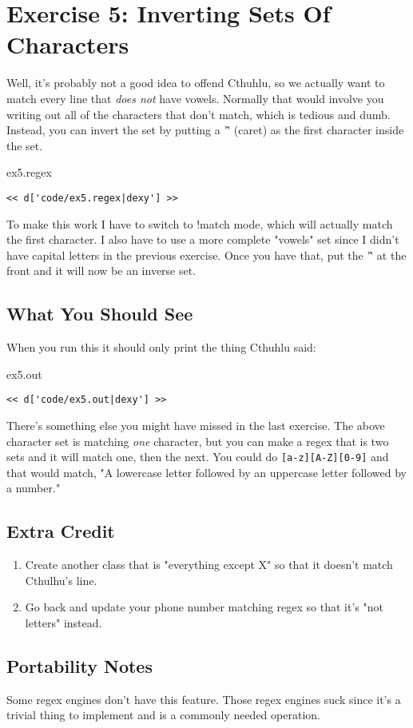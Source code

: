 \chapter{Exercise 5: Inverting Sets Of Characters}

Well, it's probably not a good idea to offend Cthuhlu, so we actually want
to match every line that \emph{does not} have vowels.  Normally that would
involve you writing out all of the characters that don't match, which is
tedious and dumb.  Instead, you can invert the set by putting a '\^' (caret)
as the first character inside the set.

\begin{code}{ex5.regex}
\begin{Verbatim}
<< d['code/ex5.regex|dexy'] >>
\end{Verbatim}
\end{code}

To make this work I have to switch to !match mode, which will actually
match the first character.  I also have to use a more complete "vowels"
set since I didn't have capital letters in the previous exercise.  Once
you have that, put the '\^' at the front and it will now be an inverse
set.

\section{What You Should See}

When you run this it should only print the thing Cthuhlu said:

\begin{code}{ex5.out}
\begin{Verbatim}
<< d['code/ex5.out|dexy'] >>
\end{Verbatim}
\end{code}

There's something else you might have missed in the last exercise.
The above character set is matching \emph{one} character, but you can
make a regex that is two sets and it will match one, then the next.
You could do \verb|[a-z][A-Z][0-9]| and that would match, "A lowercase
letter followed by an uppercase letter followed by a number."

\section{Extra Credit}

\begin{enumerate}
\item Create another class that is "everything except X" so that it
    doesn't match Cthulhu's line.
\item Go back and update your phone number matching regex so that it's
    "not letters" instead.
\end{enumerate}

\section{Portability Notes}

Some regex engines don't have this feature. Those regex engines suck
since it's a trivial thing to implement and is a commonly needed operation.

